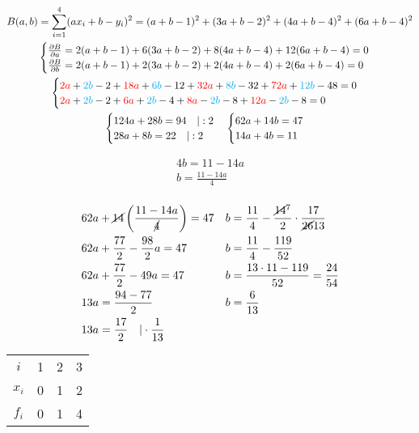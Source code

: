 \documentclass[10pt, a4paper]{article}
\begin{document}
\begin{gather*}
B(a,b)=\sum_{i=1}^4(ax_i+b-y_i)^2=(a+b-1)^2+(3a+b-2)^2+(4a+b-4)^2+(6a+b-4)^2\\
\begin{cases}
\frac{\partial B}{\partial a}=2(a+b-1)+6(3a+b-2)+8(4a+b-4)+12(6a+b-4)=0\\
\frac{\partial B}{\partial b}=2(a+b-1)+2(3a+b-2)+2(4a+b-4)+2(6a+b-4)=0
\end{cases}\\
\begin{cases}
\textcolor{red}{2a}+\textcolor{cyan}{2b}-2+\textcolor{red}{18a}+\textcolor{cyan}{6b}-12+\textcolor{red}{32a}+\textcolor{cyan}{8b}-32+\textcolor{red}{72a}+\textcolor{cyan}{12b}-48=0\\
\textcolor{red}{2a}+\textcolor{cyan}{2b}-2+\textcolor{red}{6a}+\textcolor{cyan}{2b}-4+\textcolor{red}{8a}-\textcolor{cyan}{2b}-8+\textcolor{red}{12a}-\textcolor{cyan}{2b}-8=0
\end{cases}\\
\begin{cases}
124a+28b=94 \quad|:2\\
28a+8b=22 \quad|:2
\end{cases}
\begin{cases}
62a+14b=47\\
14a+4b=11
\end{cases}\\
\end{gather*}

\begin{gather*}
4b=11-14a\\
b=\frac{11-14a}{4}\\
\end{gather*}

\begin{align*}
62a&+\cancel{14}\left(\frac{11-14a}{\cancel{4}}\right)=47 & b&=\frac{11}{4}-\frac{\cancel{14}^7}{2}\cdot\frac{17}{\cancel{26}13}\\
62a&+\frac{77}{2}-\frac{98}{2}a=47 &b&=\frac{11}{4}-\frac{119}{52}\\
62a&+\frac{77}{2}-49a=47 &b&=\frac{13\cdot11-119}{52}=\frac{24}{54}\\
13a&=\frac{94-77}{2} & b&=\frac{6}{13}\\
13a&=\frac{17}{2}\quad|\cdot\frac{1}{13}\\
\end{align*}


\begin{center}
\begin{tabular}{c c c c}
$i$&1&2&3\\
$x_i$&0&1&2\\
$f_i$&0&1&4
\end{tabular}
\end{center}
\end{document}

